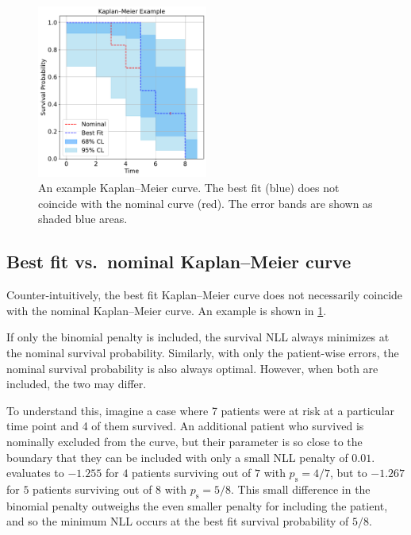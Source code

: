 \documentclass[article]{jss}
\newcommand{\KM}{Kaplan--Meier} %
\begin{document}
\begin{figure}
  \centering
  \includegraphics[width=0.5\textwidth]{km_example.pdf}
  \caption{\label{fig:best-fit-vs-nominal} An example \KM{} curve. The best fit (blue) does not coincide with the nominal curve (red). The error bands are shown as shaded blue areas.}
\end{figure}

\subsection%
[Best fit vs. nominal \KM{} curve]%
{Best fit vs.\ nominal \KM{} curve}

Counter-intuitively, the best fit \KM{} curve does not necessarily coincide with the nominal \KM{} curve. An example is shown in \cref{fig:best-fit-vs-nominal}.

If only the binomial penalty is included, the survival NLL always minimizes at the nominal survival probability. Similarly, with only the patient-wise errors, the nominal survival probability is also always optimal. However, when both are included, the two may differ.

To understand this, imagine a case where 7 patients were at risk at a particular time point and 4 of them survived. An additional patient who survived is nominally excluded from the curve, but their parameter is so close to the boundary that they can be included with only a small NLL penalty of \(0.01\)\@.  evaluates to \(-1.255\) for \(4\) patients surviving out of \(7\) with \(p_\text{s}=4/7\), but to \(-1.267\) for \(5\) patients surviving out of \(8\) with \(p_\text{s}=5/8\). This small difference in the binomial penalty outweighs the even smaller penalty for including the patient, and so the minimum NLL occurs at the best fit survival probability of \(5/8\).
\end{document}
